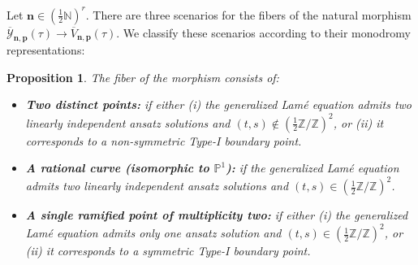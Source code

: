 \documentclass[11pt]{amsart}
\newtheorem{proposition}[theorem]{Proposition}
\theoremstyle{remark}
\numberwithin{equation}{section}
\begin{document}
\vspace{5mm}
Let $\mathbf{n} \in (\tfrac{1}{2} \mathbb{N})^r$. 
There are three scenarios for the fibers of the natural morphism $\overline{\mathcal{Y}}_{\mathbf{n},\mathbf{p}}(\tau) \rightarrow \overline{V}_{\mathbf{n},\mathbf{p}}(\tau)$. We classify these scenarios according to their monodromy representations: 

\begin{proposition} \label{generic-2-to-1} 
The fiber of the morphism consists of:
\begin{itemize}
    \item \textbf{Two distinct points:} if either (i) the generalized Lam\'e equation admits two linearly independent ansatz solutions and $(t, s) \notin (\tfrac{1}{2} \mathbb{Z} / \mathbb{Z})^2$, or (ii) it corresponds to a non-symmetric Type-I boundary point. 
    \item \textbf{A rational curve (isomorphic to $\mathbb{P}^1$):} if the generalized Lam\'e equation admits two linearly independent ansatz solutions and $(t, s) \in (\tfrac{1}{2} \mathbb{Z} / \mathbb{Z})^2$. 
    \item \textbf{A single ramified point of multiplicity two:} if either (i) the generalized Lam\'e equation admits only one ansatz solution and $(t, s) \in (\tfrac{1}{2} \mathbb{Z} / \mathbb{Z})^2$, or (ii) it corresponds to a symmetric Type-I boundary point. 
\end{itemize}
\end{proposition}
\end{document}
